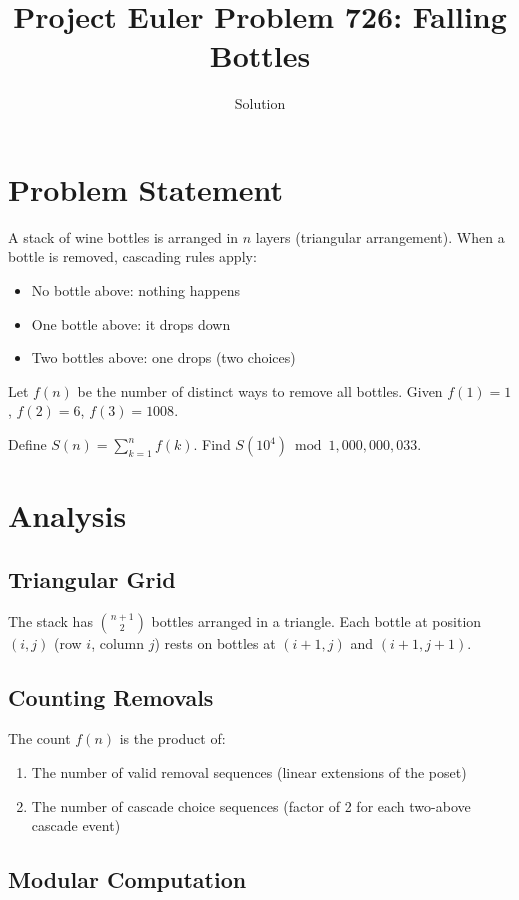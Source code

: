 \documentclass[12pt]{article}
\title{Project Euler Problem 726: Falling Bottles}
\author{Solution}
\date{}
\begin{document}
\maketitle

\section{Problem Statement}

A stack of wine bottles is arranged in $n$ layers (triangular arrangement). When a bottle is removed, cascading rules apply:
\begin{itemize}
\item No bottle above: nothing happens
\item One bottle above: it drops down
\item Two bottles above: one drops (two choices)
\end{itemize}

Let $f(n)$ be the number of distinct ways to remove all bottles. Given $f(1) = 1$, $f(2) = 6$, $f(3) = 1008$.

Define $S(n) = \sum_{k=1}^{n} f(k)$. Find $S(10^4) \bmod 1{,}000{,}000{,}033$.

\section{Analysis}

\subsection{Triangular Grid}

The stack has $\binom{n+1}{2}$ bottles arranged in a triangle. Each bottle at position $(i,j)$ (row $i$, column $j$) rests on bottles at $(i+1,j)$ and $(i+1,j+1)$.

\subsection{Counting Removals}

The count $f(n)$ is the product of:
\begin{enumerate}
\item The number of valid removal sequences (linear extensions of the poset)
\item The number of cascade choice sequences (factor of 2 for each two-above cascade event)
\end{enumerate}

\subsection{Modular Computation}
\end{document}

